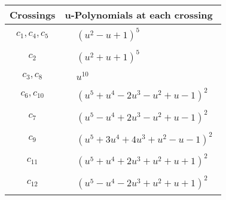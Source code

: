 \documentclass[1p]{elsarticle_modified}
\theoremstyle{definition}
\begin{document}
\begin{tabular}{m{50pt}|m{274pt}}
Crossings & \hspace{64pt}u-Polynomials at each crossing \\
\hline $$\begin{aligned}c_{1},c_{4},c_{5}\end{aligned}$$&$\begin{aligned}
&(u^2- u+1)^5
\end{aligned}$\\
\hline $$\begin{aligned}c_{2}\end{aligned}$$&$\begin{aligned}
&(u^2+u+1)^5
\end{aligned}$\\
\hline $$\begin{aligned}c_{3},c_{8}\end{aligned}$$&$\begin{aligned}
&u^{10}
\end{aligned}$\\
\hline $$\begin{aligned}c_{6},c_{10}\end{aligned}$$&$\begin{aligned}
&(u^5+u^4-2 u^3- u^2+u-1)^2
\end{aligned}$\\
\hline $$\begin{aligned}c_{7}\end{aligned}$$&$\begin{aligned}
&(u^5- u^4+2 u^3- u^2+u-1)^2
\end{aligned}$\\
\hline $$\begin{aligned}c_{9}\end{aligned}$$&$\begin{aligned}
&(u^5+3 u^4+4 u^3+u^2- u-1)^2
\end{aligned}$\\
\hline $$\begin{aligned}c_{11}\end{aligned}$$&$\begin{aligned}
&(u^5+u^4+2 u^3+u^2+u+1)^2
\end{aligned}$\\
\hline $$\begin{aligned}c_{12}\end{aligned}$$&$\begin{aligned}
&(u^5- u^4-2 u^3+u^2+u+1)^2
\end{aligned}$\\
\hline
\end{tabular}\\~\\
\end{document}
